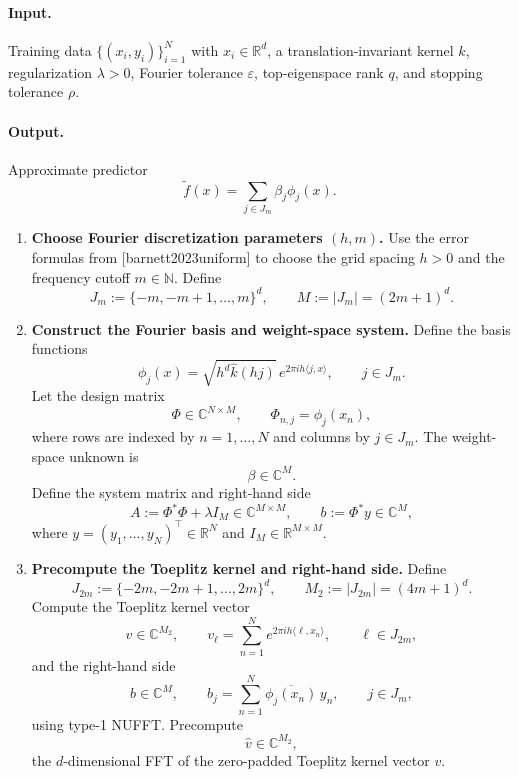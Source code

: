 \documentclass{article}
\begin{document}
\paragraph{Input.}
Training data \(\{(x_i,y_i)\}_{i=1}^N\) with \(x_i\in\mathbb{R}^d\), a translation-invariant kernel \(k\), regularization \(\lambda>0\), Fourier tolerance \(\varepsilon\), top-eigenspace rank \(q\), and stopping tolerance \(\rho\).

\paragraph{Output.}
Approximate predictor
\[
\widetilde{f}(x)=\sum_{j\in J_m}\beta_j \phi_j(x).
\]

\begin{enumerate}
    \item \textbf{Choose Fourier discretization parameters \((h,m)\).}  
    Use the error formulas from [barnett2023uniform] to choose the grid spacing \(h>0\) and the frequency cutoff \(m\in\mathbb{N}\). Define
    \[
    J_m:=\{-m,-m+1,\dots,m\}^d,
    \qquad
    M:=|J_m|=(2m+1)^d.
    \]

    \item \textbf{Construct the Fourier basis and weight-space system.}  
    Define the basis functions
    \[
    \phi_j(x)=\sqrt{h^d\widehat{k}(hj)}\,e^{2\pi i h\langle j,x\rangle},
    \qquad j\in J_m.
    \]
    Let the design matrix
    \[
    \Phi\in\mathbb{C}^{N\times M},
    \qquad
    \Phi_{n,j}=\phi_j(x_n),
    \]
    where rows are indexed by \(n=1,\dots,N\) and columns by \(j\in J_m\).  
    The weight-space unknown is
    \[
    \beta\in\mathbb{C}^{M}.
    \]
    Define the system matrix and right-hand side
    \[
    A:=\Phi^*\Phi+\lambda I_M \in \mathbb{C}^{M\times M},
    \qquad
    b:=\Phi^*y\in\mathbb{C}^{M},
    \]
    where \(y=(y_1,\dots,y_N)^\top\in\mathbb{R}^N\) and \(I_M\in\mathbb{R}^{M\times M}\).

    \item \textbf{Precompute the Toeplitz kernel and right-hand side.}  
    Define
    \[
    J_{2m}:=\{-2m,-2m+1,\dots,2m\}^d,
    \qquad
    M_{2}:=|J_{2m}|=(4m+1)^d.
    \]
    Compute the Toeplitz kernel vector
    \[
    v\in\mathbb{C}^{M_2},
    \qquad
    v_\ell=\sum_{n=1}^N e^{2\pi i h\langle \ell,x_n\rangle},
    \qquad \ell\in J_{2m},
    \]
    and the right-hand side
    \[
    b\in\mathbb{C}^M,
    \qquad
    b_j=\sum_{n=1}^N \overline{\phi_j(x_n)}\,y_n,
    \qquad j\in J_m,
    \]
    using type-1 NUFFT.  
    Precompute
    \[
    \widehat v \in \mathbb{C}^{M_2},
    \]
    the \(d\)-dimensional FFT of the zero-padded Toeplitz kernel vector \(v\).


\end{enumerate}
\end{document}

